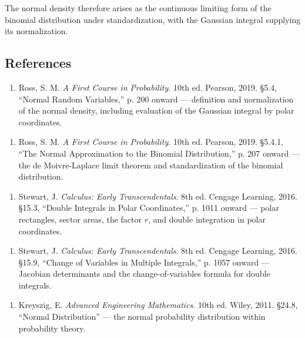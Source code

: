 \documentclass{article}
\newlength{\defaultparwidth}
\newcommand{\defaultwidthpar}[1]{%
  \par
  \noindent\hfill
  \begin{minipage}{\defaultparwidth}%
  #1%
  \end{minipage}%
  \hfill\null
  \par
}
\begin{document}
\defaultwidthpar{The normal density therefore arises as the continuous limiting form of the binomial distribution under standardization, with the Gaussian integral supplying its normalization.}

\restoregeometry
\subsection{References}
\begin{enumerate}
    \item Ross, S. M. \emph{A First Course in Probability}. 10th ed. Pearson, 2019. §5.4, “Normal Random Variables,” p. 200 onward — definition and normalization of the normal density, including evaluation of the Gaussian integral by polar coordinates.
\end{enumerate}

\begin{enumerate}
    \item Ross, S. M. \emph{A First Course in Probability}. 10th ed. Pearson, 2019. §5.4.1, “The Normal Approximation to the Binomial Distribution,” p. 207 onward — the de Moivre-Laplace limit theorem and standardization of the binomial distribution.
\end{enumerate}

\begin{enumerate}
    \item Stewart, J. \emph{Calculus: Early Transcendentals}. 8th ed. Cengage Learning, 2016. §15.3, “Double Integrals in Polar Coordinates,” p. 1011 onward — polar rectangles, sector areas, the factor $r$, and double integration in polar coordinates.
\end{enumerate}

\begin{enumerate}
    \item Stewart, J. \emph{Calculus: Early Transcendentals}. 8th ed. Cengage Learning, 2016. §15.9, “Change of Variables in Multiple Integrals,” p. 1057 onward — Jacobian determinants and the change-of-variables formula for double integrals.
\end{enumerate}

\begin{enumerate}
    \item Kreyszig, E. \emph{Advanced Engineering Mathematics}. 10th ed. Wiley, 2011. §24.8, “Normal Distribution” — the normal probability distribution within probability theory.
\end{enumerate}
\end{document}
